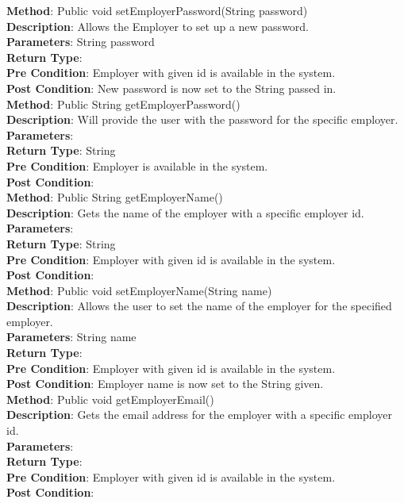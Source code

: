 \documentclass{l3deliverable}
\begin{document}
\textbf{Method}: Public void setEmployerPassword(String password) \\
\textbf{Description}: Allows the Employer to set up a new password.\\
\textbf{Parameters}: String password\\
\textbf{Return Type}: \\
\textbf{Pre Condition}: Employer with given id is available in the system.\\
\textbf{Post Condition}: New password is now set to the String passed in.\\

\textbf{Method}: Public String getEmployerPassword() \\
\textbf{Description}: Will provide the user with the password for the specific employer.\\
\textbf{Parameters}:\\
\textbf{Return Type}: String \\
\textbf{Pre Condition}: Employer is available in the system.\\
\textbf{Post Condition}:\\

\textbf{Method}: Public String getEmployerName()\\
\textbf{Description}: Gets the name of the employer with a specific employer id.\\
\textbf{Parameters}:\\
\textbf{Return Type}: String\\
\textbf{Pre Condition}: Employer with given id is available in the system.\\
\textbf{Post Condition}:\\

\textbf{Method}: Public void setEmployerName(String name)\\
\textbf{Description}: Allows the user to set the name of the employer for the specified employer.\\
\textbf{Parameters}: String name\\
\textbf{Return Type}:\\
\textbf{Pre Condition}: Employer with given id is available in the system.\\
\textbf{Post Condition}: Employer name is now set to the String given.\\

\textbf{Method}: Public void getEmployerEmail()\\
\textbf{Description}: Gets the email address for the employer with a specific employer id.\\
\textbf{Parameters}:\\
\textbf{Return Type}:\\
\textbf{Pre Condition}: Employer with given id is available in the system.\\
\textbf{Post Condition}:\\
\end{document}
